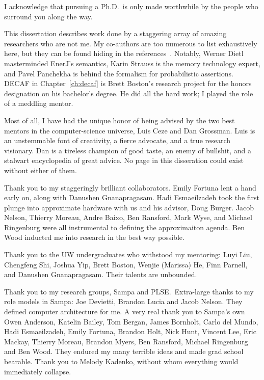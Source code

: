 I acknowledge that pursuing a Ph.D.~is only made worthwhile by the people who
surround you along the way.

This dissertation describes work done by a staggering array of amazing
researchers who are not me.
My co-authors are too numerous to list exhaustively here, but they can be
found hiding in the references~\cite{enerj, decaf, passert, approxstorage}.
Notably, Werner Dietl masterminded EnerJ's semantics,
Karin Strauss is the memory technology expert, and
Pavel Panchekha is behind the formalism for probabilistic assertions.
DECAF in Chapter~\ref{ch:decaf} is Brett Boston's research
project for the honors designation on his bachelor's degree.
He did all the hard work; I played the role of a meddling mentor.

Most of all, I have had the unique honor of being advised by the two best
mentors in the computer-science universe, Luis Ceze and Dan Grossman.
Luis is an unstemmable font of creativity, a fierce advocate, and a true
research visionary.
Dan is a tireless champion of good taste, an enemy of bullshit, and a stalwart
encyclopedia of great advice.
No page in this disseration could exist without either of them.

Thank you to my staggeringly brilliant collaborators.
Emily Fortuna lent a hand early on, along with Danushen Gnanapragasam.
Hadi Esmaeilzadeh took the first plunge into approximate hardware with us and
his advisor, Doug Burger.
Jacob Nelson, Thierry Moreau, Andre Baixo, Ben Ransford, Mark Wyse, and
Michael Ringenburg were all instrumental to defining the approximaiton agenda.
Ben Wood inducted me into research in the best way possible.

Thank you to the UW undergraduates who withstood my mentoring:
Luyi Liu,
Chengfeng Shi,
Joshua Yip,
Brett Boston,
Wenjie (Marissa) He,
Finn Parnell, and
Danushen Gnanapragasam.
Their talents are unbounded.

Thank you to my research groups, Sampa and PLSE.\ Extra-large thanks to
my role models in Sampa: Joe Devietti, Brandon Lucia and Jacob Nelson.
They defined computer architecture for me.
A very real thank you to Sampa's own
Owen Anderson,
Katelin Bailey,
Tom Bergan,
James Bornholt,
Carlo del Mundo,
Hadi Esmaeilzadeh,
Emily Fortuna,
Brandon Holt,
Nick Hunt,
Vincent Lee,
Eric Mackay,
Thierry Moreau,
Brandon Myers,
Ben Ransford,
Michael Ringenburg and
Ben Wood.
They endured my many terrible ideas and made grad school bearable.
Thank you to Melody Kadenko, without whom everything would immediately
collapse.

